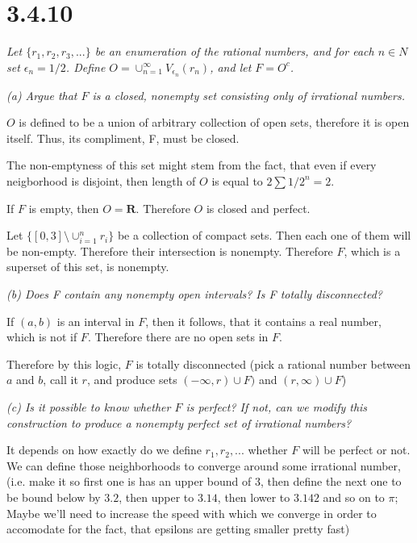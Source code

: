 \documentclass[11pt,oneside,titlepage]{article}
\begin{document}
\section*{3.4.10}
\textit{Let $\{r_1, r_2, r_3, ... \}$ be an enumeration of the rational
  numbers, and for each $n \in N$ set $\epsilon_n = 1/2$. Define
  $O = \cup_{n = 1}^{\infty}V_{\epsilon_n}(r_n)$, and let $F = O^c$.}

\textit{(a) Argue that $F$ is a closed, nonempty set consisting only of irrational numbers.}

$O$ is defined to be a union of arbitrary collection of open sets, therefore
it is open itself. Thus, its compliment, F,  must be closed.

The non-emptyness of this set might stem from the fact, that even if
every neigborhood is disjoint, then  length of $O$ is
equal to $2 \sum 1/2^n = 2$.

If $F$ is empty, then $O = \textbf{R}$. Therefore $O$ is closed and perfect.

Let $\{[0, 3] \setminus \cup_{i = 1}^{n}r_i\}$ be a collection of compact sets.
Then each one of them will be non-empty. Therefore their intersection
is nonempty. Therefore $F$, which is a superset of this set,  is nonempty.




\textit{(b) Does F contain any nonempty open intervals? Is F totally
  disconnected? }

If $(a, b)$ is an interval in $F$, then it follows, that it contains a real
number, which is not if $F$. Therefore there are no open sets in $F$.

Therefore by this logic, $F$ is totally disconnected (pick a rational
number between $a$ and $b$, call it $r$, and produce
sets $(-\infty, r) \cup F)$ and $(r, \infty) \cup F$)

\textit{(c) Is it possible to know whether $F$ is perfect? If not, can we
  modify this construction to produce a nonempty perfect set of irrational
  numbers?}

It depends on how exactly do we define $r_1, r_2,...$ whether $F$ will be
perfect or not. We can define those neighborhoods to converge around some
irrational number, (i.e. make it so first one is has an upper bound of 3,
then define the  next one to be bound below by $3.2$, then upper to $3.14$,
then lower to $3.142$ and so on to $\pi$; Maybe we'll need to increase the
speed with which we converge in order to accomodate for the fact, that
epsilons are getting smaller pretty fast)
\end{document}
